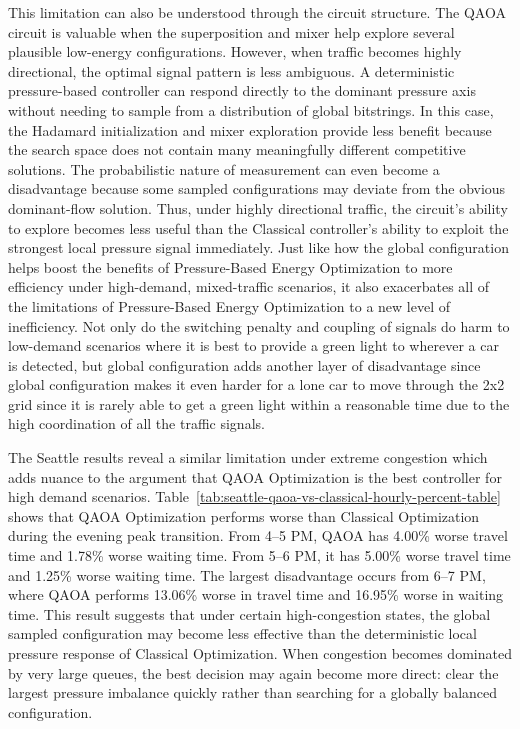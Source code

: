 \documentclass[12pt]{article}
\begin{document}
This limitation can also be understood through the circuit structure. The QAOA circuit is valuable when the superposition and mixer help explore several plausible low-energy configurations. However, when traffic becomes highly directional, the optimal signal pattern is less ambiguous. A deterministic pressure-based controller can respond directly to the dominant pressure axis without needing to sample from a distribution of global bitstrings. In this case, the Hadamard initialization and mixer exploration provide less benefit because the search space does not contain many meaningfully different competitive solutions. The probabilistic nature of measurement can even become a disadvantage because some sampled configurations may deviate from the obvious dominant-flow solution. Thus, under highly directional traffic, the circuit's ability to explore becomes less useful than the Classical controller's ability to exploit the strongest local pressure signal immediately. Just like how the global configuration helps boost the benefits of Pressure-Based Energy Optimization to more efficiency under high-demand, mixed-traffic scenarios, it also exacerbates all of the limitations of Pressure-Based Energy Optimization to a new level of inefficiency. Not only do the switching penalty and coupling of signals do harm to low-demand scenarios where it is best to provide a green light to wherever a car is detected, but global configuration adds another layer of disadvantage since global configuration makes it even harder for a lone car to move through the 2x2 grid since it is rarely able to get a green light within a reasonable time due to the high coordination of all the traffic signals.

The Seattle results reveal a similar limitation under extreme congestion which adds nuance to the argument that QAOA Optimization is the best controller for high demand scenarios. Table~\ref{tab:seattle-qaoa-vs-classical-hourly-percent-table} shows that QAOA Optimization performs worse than Classical Optimization during the evening peak transition. From 4--5 PM, QAOA has 4.00\% worse travel time and 1.78\% worse waiting time. From 5--6 PM, it has 5.00\% worse travel time and 1.25\% worse waiting time. The largest disadvantage occurs from 6--7 PM, where QAOA performs 13.06\% worse in travel time and 16.95\% worse in waiting time. This result suggests that under certain high-congestion states, the global sampled configuration may become less effective than the deterministic local pressure response of Classical Optimization. When congestion becomes dominated by very large queues, the best decision may again become more direct: clear the largest pressure imbalance quickly rather than searching for a globally balanced configuration.
\end{document}
